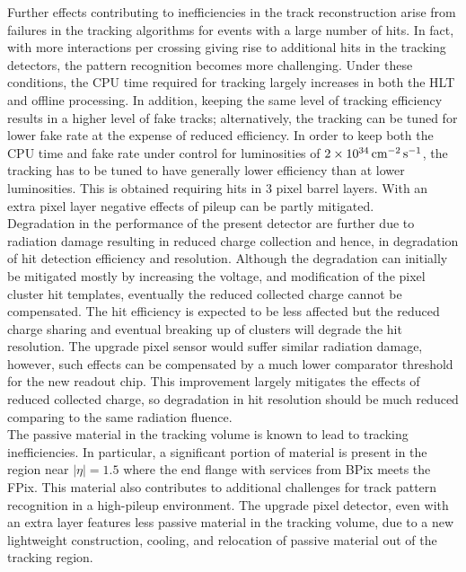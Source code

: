 Further effects contributing to inefficiencies in the track reconstruction arise from failures in the tracking algorithms for events with a large number of hits. In fact, with more interactions per crossing giving rise to additional hits in the tracking detectors, the pattern recognition becomes more challenging. Under these conditions, the CPU time required for tracking largely increases in both the HLT and offline processing. In addition, keeping the same level of tracking efficiency results in a higher level of fake tracks; alternatively, the tracking can be tuned for lower fake rate at the expense of reduced efficiency.
In order to keep both the CPU time and fake rate under control for luminosities of $2\times10^{34}\,\text{cm}^\text{$-$2}\,\text{s}^\text{$-$1}$, the tracking has to be tuned to have generally lower efficiency than at lower luminosities. This is obtained requiring hits in 3 pixel barrel layers. With an extra pixel layer negative effects of pileup can be partly mitigated.\\

Degradation in the performance of the present detector are further due to radiation damage resulting in reduced charge collection and hence, in degradation of hit detection efficiency and resolution.
Although the degradation can initially be mitigated mostly by increasing the voltage, and modification of the pixel cluster hit templates, eventually the reduced collected charge cannot be compensated.
The hit efficiency is expected to be less affected but the reduced charge sharing and eventual breaking up of clusters will degrade the hit resolution. The upgrade pixel sensor would suffer similar radiation damage, however, such effects can be compensated by a much lower comparator threshold for the new readout chip. This improvement largely mitigates the effects of reduced collected charge, so degradation in hit resolution should be much reduced comparing to the same radiation fluence.\\

The passive material in the tracking volume is known to lead to tracking inefficiencies.
In particular, a significant portion of material is present in the region near $|\eta| = 1.5$ where the end flange with services from BPix meets the FPix.
This material also contributes to additional challenges for track pattern recognition in a high-pileup environment.
The upgrade pixel detector, even with an extra layer features less passive material in the tracking volume, due to a new lightweight construction, cooling, and relocation of passive material out of the tracking region.

